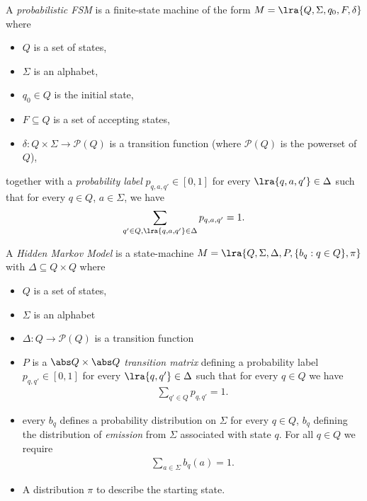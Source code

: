 \documentclass{article}
\begin{document}
\begin{definition}[L19]
	A \emph{probabilistic FSM} is a finite-state machine of the form
	$M=\lra{Q, \Sigma, q_0, F, \delta}$ where
	\begin{itemize}
		\item $Q$ is a set of states,
		\item $\Sigma$ is an alphabet,
		\item $q_0\in Q$ is the initial state,
		\item $F\subseteq Q$ is a set of accepting states,
		\item $\delta:Q\times \Sigma \to\mathcal{P}(Q)$ is a transition function 
			(where $\mathcal{P}(Q)$ is the powerset of $Q$),
	\end{itemize}
	together with a \emph{probability label} $p_{q,a,q'}\in[0,1]$ for every
	$\lra{q,a,q'}\in\Delta$ such that for every $q\in Q$, $a\in\Sigma$, we have
	\begin{align*}
		\sum_{q'\in Q, \lra{q,a,q'}\in\Delta} p_{q,a,q'}=1.
	\end{align*}
\end{definition}

\begin{definition}[L19]
	A \emph{Hidden Markov Model} is a state-machine $M=\lra{Q, \Sigma, \Delta, P, 
	\{b_q:q\in Q\}, \pi}$ with $\Delta\subseteq Q\times Q$ where
	\begin{itemize}
		\item $Q$ is a set of states,
		\item $\Sigma$ is an alphabet
		\item $\Delta:Q\to\mathcal{P}(Q)$ is a transition function
		\item $P$ is a $\abs Q \times \abs Q$ \emph{transition matrix} 
			defining a probability label $p_{q,q'}\in[0,1]$ for every 
			$\lra{q,q'}\in\Delta$ such that for every $q\in Q$ we have 
			\begin{align*}
				\sum_{q'\in Q}p_{q,q'} = 1.
			\end{align*}
        \item every $b_q$ defines a probability distribution on $\Sigma$ 
			for every $q\in Q$, $b_q$ defining the distribution of 
			\emph{emission} from $\Sigma$ associated with state $q$. For all
			$q\in Q$ we require \begin{align*}
				\sum_{a\in\Sigma} b_q(a) = 1.
			\end{align*}
        \item A distribution $\pi$ to describe the starting state.
	\end{itemize}
\end{definition}
\end{document}
